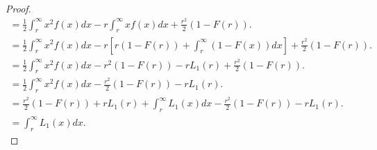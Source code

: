\documentclass[10pt,a4paper]{amsart}
\begin{document}
\begin{proof}
\begin{equation*}
\begin{gathered}
                = \frac{1}{2}\int_{r}^{\infty}x^2f(x)dx - r\int_{r}^{\infty}xf(x)dx + \frac{r^2}{2}(1-F(r)). \\
                = \frac{1}{2}\int_{r}^{\infty}x^2f(x)dx - r\left[r(1-F(r))+\int_{r}^{\infty}(1-F(x))dx\right] + \frac{r^2}{2}(1-F(r)). \\
                = \frac{1}{2}\int_{r}^{\infty}x^2f(x)dx - r^2(1-F(r))-rL_1(r)+ \frac{r^2}{2}(1-F(r)). \\
                = \frac{1}{2}\int_{r}^{\infty}x^2f(x)dx - \frac{r^2}{2}(1-F(r))-rL_1(r). \\
                = \frac{r^2}{2}(1-F(r))+rL_1(r) + \int_{r}^{\infty}L_1(x)dx- \frac{r^2}{2}(1-F(r))-rL_1(r). \\
                = \int_{r}^{\infty}L_1(x)dx.
            \end{gathered}
        \end{equation*}
    \end{proof}
\end{document}
